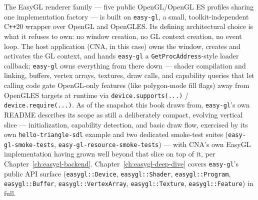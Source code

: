 The EasyGL renderer family --- five public OpenGL/OpenGL ES profiles sharing one implementation
factory --- is built on \texttt{easy-gl}, a small,
toolkit-independent C\texttt{++}20 wrapper over OpenGL and OpenGLES. Its defining
architectural choice is what it refuses to own: no window creation, no GL context creation,
no event loop. The host application (CNA, in this case) owns the window, creates and
activates the GL context, and hands \texttt{easy-gl} a \texttt{GetProcAddress}-style loader
callback; \texttt{easy-gl} owns everything from there down --- shader compilation and
linking, buffers, vertex arrays, textures, draw calls, and capability queries that let calling
code gate OpenGL-only features (like polygon-mode fill flags) away from OpenGLES targets at
runtime via \texttt{device.supports(...)} / \texttt{device.require(...)}. As of the snapshot this
book draws from, \texttt{easy-gl}'s own README describes its scope as still a deliberately
compact, evolving vertical slice --- initialization, capability detection, and basic draw flow,
exercised by its own \texttt{hello-triangle-sdl} example and two dedicated smoke-test suites
(\texttt{easy-gl-smoke-tests}, \texttt{easy-gl-resource-smoke-tests}) --- with CNA's own
EasyGL implementation having grown well beyond that slice on top of it, per
Chapter~\ref{ch:easygl-backend}. Chapter~\ref{ch:easygl-deep-dive} covers \texttt{easy-gl}'s
public API surface (\texttt{easygl::Device}, \texttt{easygl::Shader}, \texttt{easygl::Program},
\texttt{easygl::Buffer}, \texttt{easygl::VertexArray}, \texttt{easygl::Texture},
\texttt{easygl::Feature}) in full.

